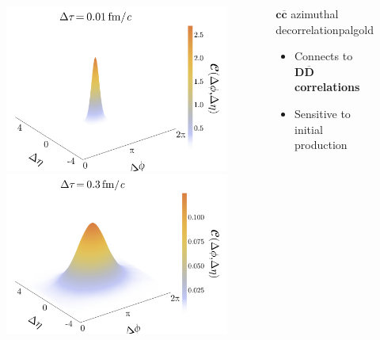 \documentclass[aspectratio=169,11pt,usenames,dvipsnames]{beamer}
\begin{document}
\begin{frame}[noframenumbering]
\begin{center}
\begin{columns}[onlytextwidth,t]
\begin{center}
                \begin{figure}
                    \centering
                    \includegraphics[width=0.5\columnwidth]
                    {images/paper_Cdetadphi_3D_toy_charm_pT_1_tau_0.01_v2.png}\hfill
                    \includegraphics[width=0.5\columnwidth]
                    {images/paper_Cdetadphi_3D_toy_charm_pT_1_tau_0.3_v2.png}
                \end{figure}
            \end{center}
            \begin{center}
                \begin{custombox2}{\normalsize $\boldsymbol{c\overline{c}}$ azimuthal decorrelation}{palgold}
                    \small
                    \begin{varwidth}{0.99\textwidth}
                    \begin{itemize}\itemsep0em 
                        \itemsep0em
                        \footnotesize
                        \item Connects to {\bfseries\color{palgold}$\boldsymbol{D\overline{D}}$ correlations}
                        \item Sensitive to initial production
                    \end{itemize}
                    \end{varwidth}
                \end{custombox2}


\end{center}
\end{columns}
\end{center}
\end{frame}
\end{document}
